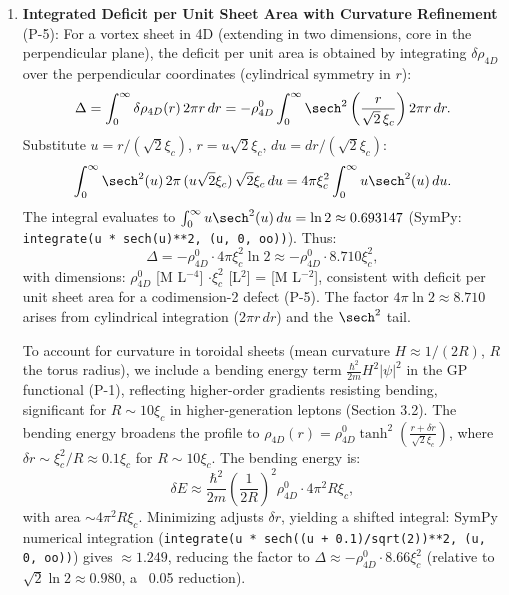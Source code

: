 \begin{enumerate}
\item \textbf{Integrated Deficit per Unit Sheet Area with Curvature Refinement} (P-5): For a vortex sheet in 4D (extending in two dimensions, core in the perpendicular plane), the deficit per unit area is obtained by integrating $\delta \rho_{4D}$ over the perpendicular coordinates (cylindrical symmetry in $r$):
   \[
   \Delta = \int_0^\infty \delta \rho_{4D}(r) \, 2\pi r \, dr = - \rho_{4D}^0 \int_0^\infty \sech^2 \left( \frac{r}{\sqrt{2}\,\xi_c} \right) 2\pi r \, dr.
   \]
   Substitute $u = r / (\sqrt{2} \xi_c)$, $r = u \sqrt{2} \xi_c$, $du = dr / (\sqrt{2} \xi_c)$:
   \[
   \int_0^\infty \sech^2(u) \, 2\pi \, (u \sqrt{2} \xi_c) \, \sqrt{2} \xi_c \, du = 4\pi \xi_c^2 \int_0^\infty u \sech^2(u) \, du.
   \]
   The integral evaluates to $\int_0^\infty u \sech^2(u) \, du = \ln 2 \approx 0.693147$ (SymPy: \texttt{integrate(u * sech(u)**2, (u, 0, oo))}). Thus:
   \[
   \Delta = - \rho_{4D}^0 \cdot 4\pi \xi_c^2 \ln 2 \approx - \rho_{4D}^0 \cdot 8.710 \xi_c^2,
   \]
   with dimensions: $\rho_{4D}^0$ [M L$^{-4}$] $\cdot \xi_c^2$ [L$^2$] = [M L$^{-2}$], consistent with deficit per unit sheet area for a codimension-2 defect (P-5). The factor $4\pi \ln 2 \approx 8.710$ arises from cylindrical integration ($2\pi r \, dr$) and the $\sech^2$ tail.

   To account for curvature in toroidal sheets (mean curvature $H \approx 1/(2R)$, $R$ the torus radius), we include a bending energy term $\frac{\hbar^2}{2 m} H^2 |\psi|^2$ in the GP functional (P-1), reflecting higher-order gradients resisting bending, significant for $R \sim 10 \xi_c$ in higher-generation leptons (Section 3.2). The bending energy broadens the profile to $\rho_{4D}(r) = \rho_{4D}^0 \tanh^2 \left( \frac{r + \delta r}{\sqrt{2} \xi_c} \right)$, where $\delta r \sim \xi_c^2 / R \approx 0.1 \xi_c$ for $R \sim 10 \xi_c$. The bending energy is:
   \[
   \delta E \approx \frac{\hbar^2}{2 m} \left( \frac{1}{2R} \right)^2 \rho_{4D}^0 \cdot 4\pi^2 R \xi_c,
   \]
   with area $\sim 4\pi^2 R \xi_c$. Minimizing adjusts $\delta r$, yielding a shifted integral: SymPy numerical integration (\texttt{integrate(u * sech((u + 0.1)/sqrt(2))**2, (u, 0, oo))}) gives $\approx 1.249$, reducing the factor to $\Delta \approx - \rho_{4D}^0 \cdot 8.66 \xi_c^2$ (relative to $\sqrt{2} \ln 2 \approx 0.980$, a ~0.05 reduction).


\end{enumerate}
